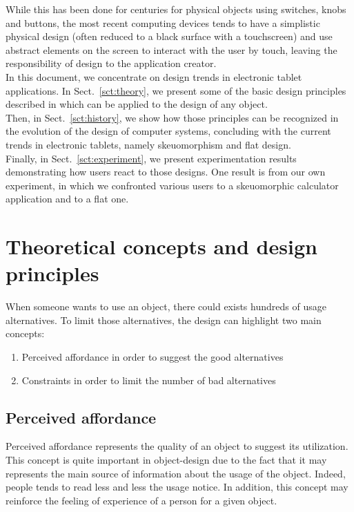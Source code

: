 \documentclass[a4paper,11pt] {article}
\theoremstyle{definition}
\begin{document}
While this has been done for centuries for physical objects using switches, knobs and buttons, the most recent computing devices tends to have a simplistic physical design (often reduced to a black surface with a touchscreen) and use abstract elements on the screen to interact with the user by touch, leaving the responsibility of design to the application creator.\\

In this document, we concentrate on design trends in electronic tablet applications. In Sect.~\ref{sct:theory}, we present some of the basic design principles described in \cite{Norman02} which can be applied to the design of any object.\\

Then, in Sect.~\ref{sct:history}, we show how those principles can be recognized in the evolution of the design of computer systems, concluding with the current trends in electronic tablets, namely skeuomorphism and flat design.\\

Finally, in Sect.~\ref{sct:experiment}, we present experimentation results demonstrating how users react to those designs. One result is from our own experiment, in which we confronted various users to a skeuomorphic calculator application and to a flat one.\\

\section{Theoretical concepts and design principles}
When someone wants to use an object, there could exists hundreds of usage alternatives. To limit those alternatives, the design can highlight two main concepts:
\begin{enumerate}
\item Perceived affordance in order to suggest the good alternatives
\item Constraints in order to limit the number of bad alternatives
\end{enumerate}

\label{sct:theory}

    \subsection{Perceived affordance}

Perceived affordance represents the quality of an object to suggest its utilization. This concept is quite important in object-design due to the fact that it may represents the main source of information about the usage of the object. Indeed, people tends to read less and less the usage notice. In addition, this concept may reinforce the feeling of experience of a person for a given object.
\end{document}

